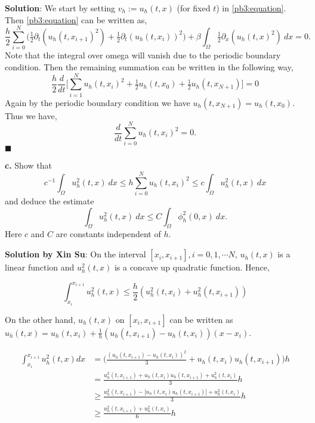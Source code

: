 \documentclass[11pt]{article}
\begin{document}
\textbf{Solution}: We start by setting $v_h := u_h(t,x)$ (for fixed $t$) in \eqref{pb3:equation}.
Then \eqref{pb3:equation} can be written as,
\begin{equation}
    \frac{h}{2} \sum_{i=0}^N \big(\tfrac{1}{2} \partial_t(u_h(t,x_{i+1})^2) + \tfrac{1}{2} \partial_t (u_h(t,x_i))^2 \big) + \beta \int_\Omega \tfrac{1}{2} \partial_x(u_h(t,x)^2) \: dx = 0.
\end{equation}
Note that the integral over omega will vanish due to the periodic boundary condition.
Then the remaining summation can be written in the following way,
\begin{equation}
    \frac{h}{2}  \frac{d}{dt} \Big[ \sum_{i=1}^{N} u_h(t,x_i)^2 + \tfrac{1}{2} u_h(t,x_0) + \tfrac{1}{2} u_h(t,x_{N+1})  \Big] = 0
\end{equation}
Again by the periodic boundary condition we have $u_h(t,x_{N+1}) = u_h(t,x_0)$. 
Thus we have, 
\begin{equation}
    \frac{d}{dt} \sum_{i=0}^N u_h(t,x_i)^2 = 0.
\end{equation}
$\blacksquare$

\vskip 2cm


\textbf{c.} Show that 
\begin{equation}
    c^{-1} \int_\Omega u^2_h(t,x) \: dx \leq h \sum_{i=0}^N u_h(t,x_i)^2 \leq c \int_\Omega u^2_h(t,x) \: dx
\end{equation}
and deduce the estimate 
\begin{equation}
    \int_\Omega u^2_h(t,x) \: dx \leq C\int_\Omega \phi^2_h(0,x) \: dx.
\end{equation}
Here $c$ and $C$ are constants independent of $h$.

\vskip 1cm

\textbf{Solution by Xin Su}: On the interval $[x_i,x_{i+1}], i=0,1,\cdots N$, $u_h(t,x)$ is a linear function and $u_h^2(t,x)$ is a concave up quadratic function. Hence, 

\begin{equation}
\label{eq:left}
\int_{x_i}^{x_{i+1}} u_h^2(t,x)\leq \frac{h}{2}(u_h^2(t,x_i)+u_h^2(t,x_{i+1}))
\end{equation}

On the other hand, $u_h(t,x)$ on $[x_i,x_{i+1}]$ can be written as $u_h(t,x)=u_h(t,x_{i}) + \frac{1}{h} (u_h(t,x_{i+1})-u_h(t,x_i)) (x-x_i)$.

\begin{equation}\label{eq:right}
\begin{aligned}
\int_{x_i}^{x_{i+1}} u_h^2(t,x) dx 
&= \Big(\frac{(u_h(t,x_{i+1})-u_h(t,x_{i}))^2}{3} + u_h(t,x_{i})u_h(t,x_{i+1})\Big) h \\
&= \frac{u_h^2(t,x_{i+1})+u_h(t,x_{i})u_h(t,x_{i+1})+u_h^2(t,x_{i})}{3}h \\
&\geq \frac{u_h^2(t,x_{i+1})-|u_h(t,x_{i})u_h(t,x_{i+1})|+u_h^2(t,x_{i})}{3}h \\ 
&\geq \frac{u_h^2(t,x_{i+1})+u_h^2(t,x_{i})}{6}h
\end{aligned}
\end{equation}
\end{document}
